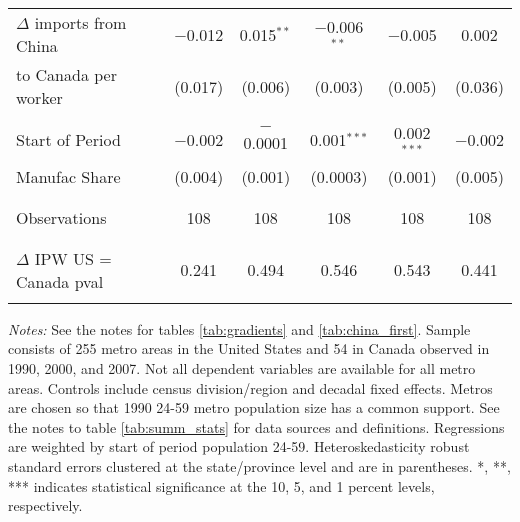 \begin{sidewaystable}[!htbp]
\begin{threeparttable}
\begin{tabular}{@{\extracolsep{5pt}}lccccc}
 \\[-1.5ex]
 $\Delta$ imports from China & $-$0.012 & 0.015$^{**}$ & $-$0.006$^{**}$ & $-$0.005 & 0.002 \\ 
to Canada per worker  & (0.017) & (0.006) & (0.003) & (0.005) & (0.036) \\ 
  & & & & & \\ 
 Start of Period & $-$0.002 & $-$0.0001 & 0.001$^{***}$ & 0.002$^{***}$ & $-$0.002 \\ 
Manufac Share  & (0.004) & (0.001) & (0.0003) & (0.001) & (0.005) \\ 
  & & & & & \\ 
\cline{2-6} \\[-2.0ex]
Observations & 108 & 108 & 108 & 108 & 108 \\ 
\\[-2.0ex]
\hline \\[-2.0ex]
$\Delta$ IPW US = Canada pval & 0.241 & 0.494 & 0.546 & 0.543 & 0.441 \\
\hline 
\hline \\[-1.8ex] 
\end{tabular} 
\begin{tablenotes}
\footnotesize
\item \textit{Notes:} See the notes for tables \ref{tab:gradients} and \ref{tab:china_first}. Sample consists of 255 metro areas in the United States and 54 in  Canada observed  in  1990, 2000, and 2007. Not all dependent variables are available for all metro areas. Controls include census division/region and decadal fixed effects. Metros are chosen so that 1990 24-59 metro population size has a common support. See the notes to table \ref{tab:summ_stats} for data sources and definitions. Regressions are  weighted by start of period population 24-59. Heteroskedasticity robust standard errors clustered at the state/province level and are in parentheses. *, **, *** indicates statistical significance at the 10, 5, and 1 percent levels, respectively.
\end{tablenotes}
\end{threeparttable}
\end{sidewaystable} 



